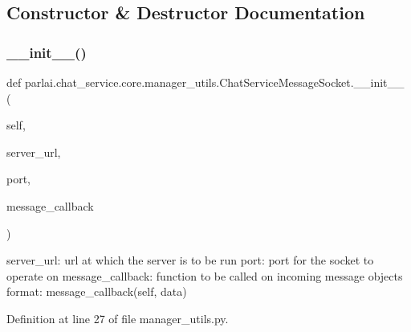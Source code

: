 \subsection{Constructor \& Destructor Documentation}
\mbox{\label{classparlai_1_1chat__service_1_1core_1_1manager__utils_1_1ChatServiceMessageSocket_ae21cee0e3e221d9c8480abdd3dd56eee}} 
\subsubsection{\texorpdfstring{\+\_\+\+\_\+init\+\_\+\+\_\+()}{\_\_init\_\_()}}
{\footnotesize\ttfamily def parlai.\+chat\+\_\+service.\+core.\+manager\+\_\+utils.\+Chat\+Service\+Message\+Socket.\+\_\+\+\_\+init\+\_\+\+\_\+ (\begin{DoxyParamCaption}\item[{}]{self,  }\item[{}]{server\+\_\+url,  }\item[{}]{port,  }\item[{}]{message\+\_\+callback }\end{DoxyParamCaption})}

\begin{DoxyVerb}server_url:           url at which the server is to be run
port:                 port for the socket to operate on
message_callback:     function to be called on incoming message objects
              format: message_callback(self, data)
\end{DoxyVerb}
 

Definition at line 27 of file manager\+\_\+utils.\+py.



